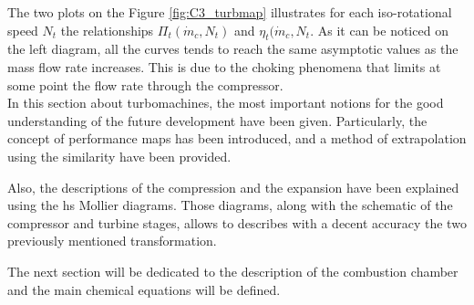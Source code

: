 The two plots on the Figure \ref{fig:C3_turbmap} illustrates for each iso-rotational speed $N_t$ the relationships $\Pi_t(\dot{m}_c,N_t)$ and $\eta_t(\dot{m}_c,N_t$. As it can be noticed on the left diagram, all the curves tends to reach the same asymptotic values as the mass flow rate increases. This is due to the choking phenomena that limits at some point the flow rate through the compressor.\\

In this section about turbomachines, the most important notions for the good understanding of the future development have been given. Particularly, the concept of performance maps has been introduced, and a method of extrapolation using the similarity have been provided. 

Also, the descriptions of the compression and the expansion have been explained using the hs Mollier diagrams. Those diagrams, along with the schematic of the compressor and turbine stages, allows to describes with a decent accuracy the two previously mentioned transformation. 

The next section will be dedicated to the description of the combustion chamber and the main chemical equations will be defined.

 